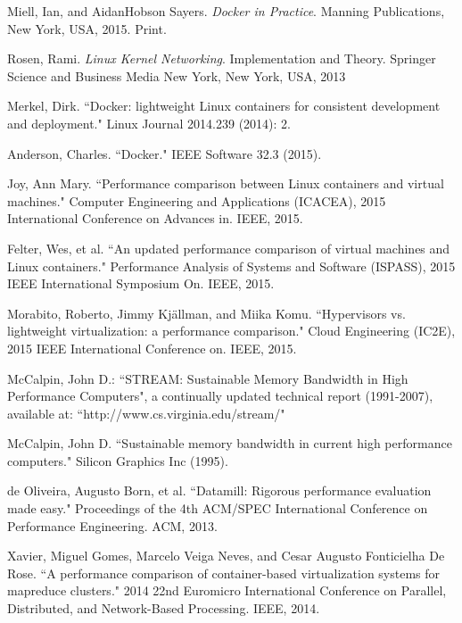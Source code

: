 \documentclass[11pt]{article}
\begin{document}
	\begin{thebibliography}{99}
		Miell, Ian, and AidanHobson Sayers. \textit{Docker in Practice}. Manning Publications, New York, USA, 2015. Print.
		
		Rosen, Rami. \textit{Linux Kernel Networking}. Implementation and Theory. Springer Science and Business Media New York, New York, USA, 2013
		
		Merkel, Dirk. ``Docker: lightweight Linux containers for consistent development and deployment." Linux Journal 2014.239 (2014): 2.
		
		Anderson, Charles. ``Docker." IEEE Software 32.3 (2015).
		
		Joy, Ann Mary. ``Performance comparison between Linux containers and virtual machines." Computer Engineering and Applications (ICACEA), 2015 International Conference on Advances in. IEEE, 2015.
		
		Felter, Wes, et al. ``An updated performance comparison of virtual machines and Linux containers." Performance Analysis of Systems and Software (ISPASS), 2015 IEEE International Symposium On. IEEE, 2015.
		
		Morabito, Roberto, Jimmy Kjällman, and Miika Komu. ``Hypervisors vs. lightweight virtualization: a performance comparison." Cloud Engineering (IC2E), 2015 IEEE International Conference on. IEEE, 2015.
		
		McCalpin, John D.: ``STREAM: Sustainable Memory Bandwidth in
		High Performance Computers", a continually updated technical report
		(1991-2007), available at: ``http://www.cs.virginia.edu/stream/"
		
		McCalpin, John D. ``Sustainable memory bandwidth in current high performance computers." Silicon Graphics Inc (1995).
		
		de Oliveira, Augusto Born, et al. ``Datamill: Rigorous performance evaluation made easy." Proceedings of the 4th ACM/SPEC International Conference on Performance Engineering. ACM, 2013.
		
		Xavier, Miguel Gomes, Marcelo Veiga Neves, and Cesar Augusto Fonticielha De Rose. ``A performance comparison of container-based virtualization systems for mapreduce clusters." 2014 22nd Euromicro International Conference on Parallel, Distributed, and Network-Based Processing. IEEE, 2014.
		

\end{thebibliography}
\end{document}

